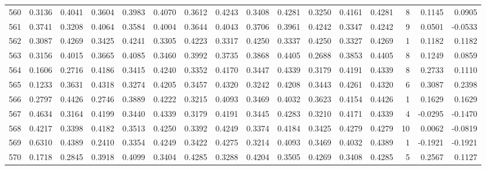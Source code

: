 \begin{tabular}{lrrrrrrrrrrrrrrr}
560 &      0.3136 &  0.4041 &  0.3604 &  0.3983 &  0.4070 &  0.3612 &  0.4243 &  0.3408 &  0.4281 &  0.3250 &   0.4161 &     0.4281 &      8 &                    0.1145 &                     0.0905 \\
561 &      0.3741 &  0.3208 &  0.4064 &  0.3584 &  0.4004 &  0.3644 &  0.4043 &  0.3706 &  0.3961 &  0.4242 &   0.3347 &     0.4242 &      9 &                    0.0501 &                    -0.0533 \\
562 &      0.3087 &  0.4269 &  0.3425 &  0.4241 &  0.3305 &  0.4223 &  0.3317 &  0.4250 &  0.3337 &  0.4250 &   0.3327 &     0.4269 &      1 &                    0.1182 &                     0.1182 \\
563 &      0.3156 &  0.4015 &  0.3665 &  0.4085 &  0.3460 &  0.3992 &  0.3735 &  0.3868 &  0.4405 &  0.2688 &   0.3853 &     0.4405 &      8 &                    0.1249 &                     0.0859 \\
564 &      0.1606 &  0.2716 &  0.4186 &  0.3415 &  0.4240 &  0.3352 &  0.4170 &  0.3447 &  0.4339 &  0.3179 &   0.4191 &     0.4339 &      8 &                    0.2733 &                     0.1110 \\
565 &      0.1233 &  0.3631 &  0.4318 &  0.3274 &  0.4205 &  0.3457 &  0.4320 &  0.3242 &  0.4208 &  0.3443 &   0.4261 &     0.4320 &      6 &                    0.3087 &                     0.2398 \\
566 &      0.2797 &  0.4426 &  0.2746 &  0.3889 &  0.4222 &  0.3215 &  0.4093 &  0.3469 &  0.4032 &  0.3623 &   0.4154 &     0.4426 &      1 &                    0.1629 &                     0.1629 \\
567 &      0.4634 &  0.3164 &  0.4199 &  0.3440 &  0.4339 &  0.3179 &  0.4191 &  0.3445 &  0.4283 &  0.3210 &   0.4171 &     0.4339 &      4 &                   -0.0295 &                    -0.1470 \\
568 &      0.4217 &  0.3398 &  0.4182 &  0.3513 &  0.4250 &  0.3392 &  0.4249 &  0.3374 &  0.4184 &  0.3425 &   0.4279 &     0.4279 &     10 &                    0.0062 &                    -0.0819 \\
569 &      0.6310 &  0.4389 &  0.2410 &  0.3354 &  0.4249 &  0.3422 &  0.4275 &  0.3214 &  0.4093 &  0.3469 &   0.4032 &     0.4389 &      1 &                   -0.1921 &                    -0.1921 \\
570 &      0.1718 &  0.2845 &  0.3918 &  0.4099 &  0.3404 &  0.4285 &  0.3288 &  0.4204 &  0.3505 &  0.4269 &   0.3408 &     0.4285 &      5 &                    0.2567 &                     0.1127 \\

\end{tabular}
